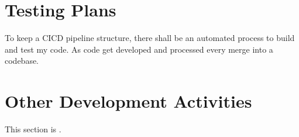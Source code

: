 \section{Testing Plans}
\label{loc:SDP_TestingPlans}
% 

To keep a CICD pipeline structure, there shall be an automated process to build and test my code. As code get developed and processed every merge into a codebase.


\section{Other Development Activities}
\label{loc:SDP_OtherDevelopmentActivities}
% 

This section is \TBD.